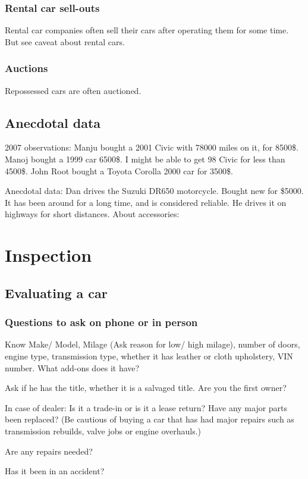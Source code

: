 \documentclass[oneside, article]{memoir}
\begin{document}
\subsection{Rental car sell-outs}
Rental car companies often sell their cars after operating them for some time. But see caveat about rental cars.

\subsection{Auctions}
Repossessed cars are often auctioned. \tbc

\section{Anecdotal data}
2007 observations: Manju bought a 2001 Civic with 78000 miles on it, for 8500\$. Manoj bought a 1999 car 6500\$. I might be able to get 98 Civic for less than 4500\$. John Root bought a Toyota Corolla 2000 car for 3500\$.

Anecdotal data: Dan drives the Suzuki DR650 motorcycle. Bought new for \$5000. It has been around for a long time, and is considered reliable. He drives it on highways for short distances.
About accessories:

\chapter{Inspection}
\section{Evaluating a car}
\subsection{Questions to ask on phone or in person}
Know Make/ Model, Milage (Ask reason for low/ high milage), number of doors, engine type, transmission type, whether it has leather or cloth upholstery, VIN number. What add-ons does it have?

Ask if he has the title, whether it is a salvaged title. Are you the first owner?

In case of dealer: Is it a trade-in or is it a lease return? Have any major parts been replaced? (Be cautious of buying a car that has had major repairs such as transmission rebuilds, valve jobs or engine overhauls.)

Are any repairs needed?

Has it been in an accident?
\end{document}
